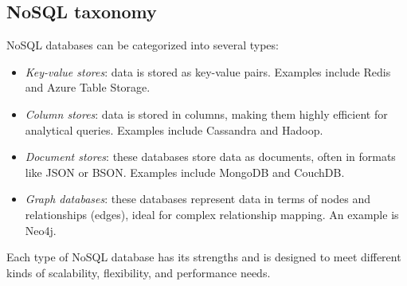 \subsection{NoSQL taxonomy}
NoSQL databases can be categorized into several types:
\begin{itemize}
    \item \textit{Key-value stores}: data is stored as key-value pairs. 
        Examples include Redis and Azure Table Storage.
    \item \textit{Column stores}: data is stored in columns, making them highly efficient for analytical queries. 
        Examples include Cassandra and Hadoop.
    \item \textit{Document stores}: these databases store data as documents, often in formats like JSON or BSON. 
        Examples include MongoDB and CouchDB.
    \item \textit{Graph databases}: these databases represent data in terms of nodes and relationships (edges), ideal for complex relationship mapping. 
        An example is Neo4j.
\end{itemize}
Each type of NoSQL database has its strengths and is designed to meet different kinds of scalability, flexibility, and performance needs.
